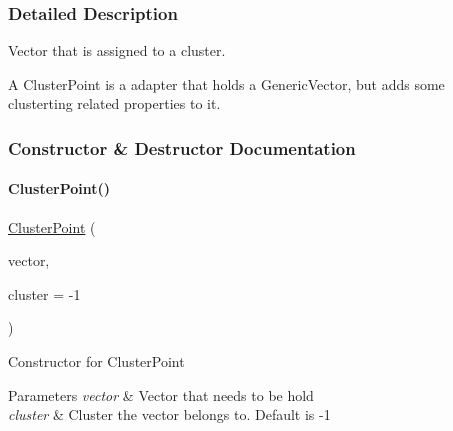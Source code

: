 \subsubsection{Detailed Description}
Vector that is assigned to a cluster. 

A Cluster\+Point is a adapter that holds a Generic\+Vector, but adds some clusterting related properties to it. 

\subsubsection{Constructor \& Destructor Documentation}
\mbox{\label{classDataTools_1_1clustering_1_1ClusterPoint_ad883ecd18ede56e817024bf3c7f04f8f_ad883ecd18ede56e817024bf3c7f04f8f}} 
\paragraph{\texorpdfstring{Cluster\+Point()}{ClusterPoint()}}
{\footnotesize\ttfamily \hyperlink{classDataTools_1_1clustering_1_1ClusterPoint}{Cluster\+Point} (\begin{DoxyParamCaption}\item[{\hyperlink{classDataTools_1_1GenericVector}{Generic\+Vector}}]{vector,  }\item[{int}]{cluster = {\ttfamily -\/1} }\end{DoxyParamCaption})\hspace{0.3cm}{\ttfamily [package]}}

Constructor for Cluster\+Point 
\begin{DoxyParams}{Parameters}
{\em vector} & Vector that needs to be hold \\
\hline
{\em cluster} & Cluster the vector belongs to. Default is {\ttfamily -\/1} \\
\hline
\end{DoxyParams}
